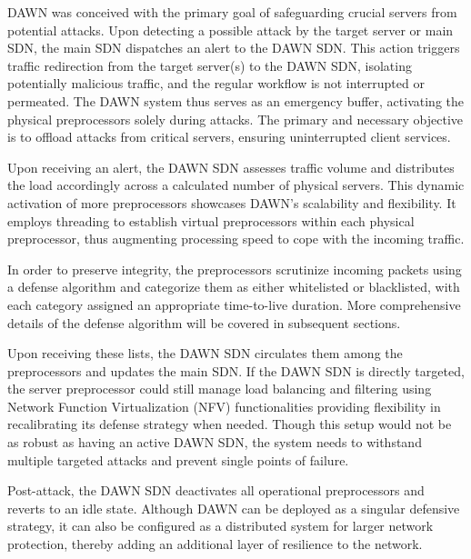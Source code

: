 \documentclass[conference]{IEEEtran}
\begin{document}
 DAWN was conceived with the primary goal of safeguarding crucial servers from potential attacks. Upon detecting a possible attack by the target server or main SDN, the main SDN dispatches an alert to the DAWN SDN. This action triggers traffic redirection from the target server(s) to the DAWN SDN, isolating potentially malicious traffic, and the regular workflow is not interrupted or permeated. The DAWN system thus serves as an emergency buffer, activating the physical preprocessors solely during attacks. The primary and necessary objective is to offload attacks from critical servers, ensuring uninterrupted client services.

Upon receiving an alert, the DAWN SDN assesses traffic volume and distributes the load accordingly across a calculated number of physical servers. This dynamic activation of more preprocessors showcases DAWN's scalability and flexibility. It employs threading to establish virtual preprocessors within each physical preprocessor, thus augmenting processing speed to cope with the incoming traffic. 

In order to preserve integrity, the preprocessors scrutinize incoming packets using a defense algorithm and categorize them as either whitelisted or blacklisted, with each category assigned an appropriate time-to-live duration. More comprehensive details of the defense algorithm will be covered in subsequent sections. 

Upon receiving these lists, the DAWN SDN circulates them among the preprocessors and updates the main SDN. If the DAWN SDN is directly targeted, the server preprocessor could still manage load balancing and filtering using Network Function Virtualization (NFV) functionalities providing flexibility in recalibrating its defense strategy when needed. Though this setup would not be as robust as having an active DAWN SDN, the system needs to withstand multiple targeted attacks and prevent single points of failure.

Post-attack, the DAWN SDN deactivates all operational preprocessors and reverts to an idle state. Although DAWN can be deployed as a singular defensive strategy, it can also be configured as a distributed system for larger network protection, thereby adding an additional layer of resilience to the network.
\end{document}
